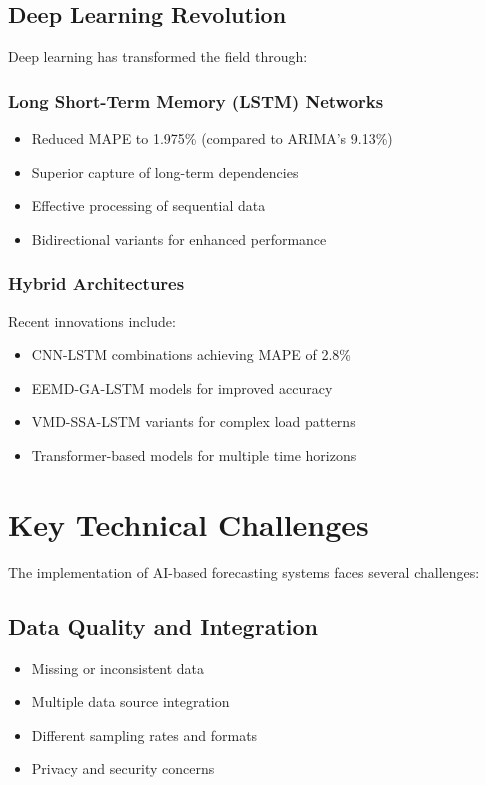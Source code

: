 \documentclass[12pt,a4paper]{report}
\begin{document}
\subsection{Deep Learning Revolution}
Deep learning has transformed the field through:

\subsubsection{Long Short-Term Memory (LSTM) Networks}
\begin{itemize}
\item Reduced MAPE to 1.975\% (compared to ARIMA's 9.13\%)
\item Superior capture of long-term dependencies
\item Effective processing of sequential data
\item Bidirectional variants for enhanced performance
\end{itemize}

\subsubsection{Hybrid Architectures}
Recent innovations include:
\begin{itemize}
\item CNN-LSTM combinations achieving MAPE of 2.8\%
\item EEMD-GA-LSTM models for improved accuracy
\item VMD-SSA-LSTM variants for complex load patterns
\item Transformer-based models for multiple time horizons
\end{itemize}

\section{Key Technical Challenges}
The implementation of AI-based forecasting systems faces several challenges:

\subsection{Data Quality and Integration}
\begin{itemize}
\item Missing or inconsistent data
\item Multiple data source integration
\item Different sampling rates and formats
\item Privacy and security concerns
\end{itemize}
\end{document}
